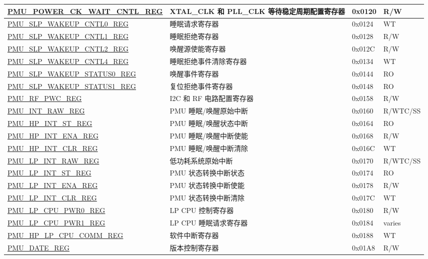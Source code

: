 \begin{longtable}{ | l | L{6cm} | l | l | }
\hyperref[regdesc:PMUPOWERCKWAITCNTLREG]{PMU\_POWER\_CK\_WAIT\_CNTL\_REG} & XTAL\_CLK 和 PLL\_CLK 等待稳定周期配置寄存器 & 0x0120 & R/W \\ \hline
\hyperref[regdesc:PMUSLPWAKEUPCNTL0REG]{PMU\_SLP\_WAKEUP\_CNTL0\_REG} & 睡眠请求寄存器 & 0x0124 & WT \\ \hline
\hyperref[regdesc:PMUSLPWAKEUPCNTL1REG]{PMU\_SLP\_WAKEUP\_CNTL1\_REG} & 睡眠拒绝寄存器 & 0x0128 & R/W \\ \hline
\hyperref[regdesc:PMUSLPWAKEUPCNTL2REG]{PMU\_SLP\_WAKEUP\_CNTL2\_REG} & 唤醒源使能寄存器 & 0x012C & R/W \\ \hline
\hyperref[regdesc:PMUSLPWAKEUPCNTL4REG]{PMU\_SLP\_WAKEUP\_CNTL4\_REG} & 睡眠拒绝事件清除寄存器 & 0x0134 & WT \\ \hline
\hyperref[regdesc:PMUSLPWAKEUPSTATUS0REG]{PMU\_SLP\_WAKEUP\_STATUS0\_REG} & 唤醒事件寄存器 & 0x0144 & RO \\ \hline
\hyperref[regdesc:PMUSLPWAKEUPSTATUS1REG]{PMU\_SLP\_WAKEUP\_STATUS1\_REG} & 复位拒绝事件寄存器 & 0x0148 & RO \\ \hline
\hyperref[regdesc:PMURFPWCREG]{PMU\_RF\_PWC\_REG} & I2C 和 RF 电路配置寄存器 & 0x0158 & R/W \\ \hline
\hyperref[regdesc:PMUINTRAWREG]{PMU\_INT\_RAW\_REG} & PMU 睡眠/唤醒原始中断 & 0x0160 & R/WTC/SS \\ \hline
\hyperref[regdesc:PMUHPINTSTREG]{PMU\_HP\_INT\_ST\_REG} & PMU 睡眠/唤醒状态中断 & 0x0164 & RO \\ \hline
\hyperref[regdesc:PMUHPINTENAREG]{PMU\_HP\_INT\_ENA\_REG} & PMU 睡眠/唤醒中断使能 & 0x0168 & R/W \\ \hline
\hyperref[regdesc:PMUHPINTCLRREG]{PMU\_HP\_INT\_CLR\_REG} & PMU 睡眠/唤醒中断清除 & 0x016C & WT \\ \hline
\hyperref[regdesc:PMULPINTRAWREG]{PMU\_LP\_INT\_RAW\_REG} & 低功耗系统原始中断 & 0x0170 & R/WTC/SS \\ \hline
\hyperref[regdesc:PMULPINTSTREG]{PMU\_LP\_INT\_ST\_REG} & PMU 状态转换中断状态 & 0x0174 & RO \\ \hline
\hyperref[regdesc:PMULPINTENAREG]{PMU\_LP\_INT\_ENA\_REG} & PMU 状态转换中断使能 & 0x0178 & R/W \\ \hline
\hyperref[regdesc:PMULPINTCLRREG]{PMU\_LP\_INT\_CLR\_REG} & PMU 状态转换中断清除 & 0x017C & WT \\ \hline
\hyperref[regdesc:PMULPCPUPWR0REG]{PMU\_LP\_CPU\_PWR0\_REG} & LP CPU 控制寄存器 & 0x0180 & R/W \\ \hline
\hyperref[regdesc:PMULPCPUPWR1REG]{PMU\_LP\_CPU\_PWR1\_REG} & LP CPU 睡眠请求寄存器 & 0x0184 & varies \\ \hline
\hyperref[regdesc:PMUHPLPCPUCOMMREG]{PMU\_HP\_LP\_CPU\_COMM\_REG} & 软件中断寄存器 & 0x0188 & WT \\ \hline

\hyperref[regdesc:PMUDATEREG]{PMU\_DATE\_REG} & 版本控制寄存器 & 0x01A8 & R/W \\ \hline
\end{longtable}
